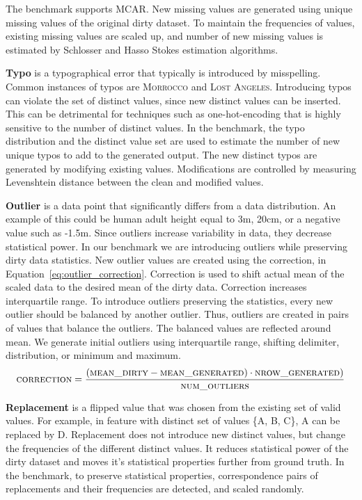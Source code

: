 The benchmark supports MCAR. 
New missing values are generated using unique missing values of the original dirty dataset. 
To maintain the frequencies of values, existing missing values are scaled up, and number of new missing values is estimated by Schlosser \cite{HassNSS1995} and Hasso Stokes \cite{HassS1998} estimation algorithms.

\textbf{Typo} is a typographical error that typically is introduced by misspelling. 
Common instances of typos are \textsc{Morrocco} and \textsc{Lost Angeles}. 
Introducing typos can violate the set of distinct values, since new distinct values can be inserted.
This can be detrimental for techniques such as one-hot-encoding that is highly sensitive to the number of distinct values.
In the benchmark, the typo distribution and the distinct value set are used to estimate the number of new unique typos to add to the generated output. 
The new distinct typos are generated by modifying existing values. Modifications are controlled by measuring Levenshtein distance between the clean and modified values. 


\textbf{Outlier} is a data point that significantly differs from a data distribution.
An example of this could be human adult height equal to 3m, 20cm, or a negative value such as -1.5m. 
Since outliers increase variability in data, they decrease statistical power.
In our benchmark we are introducing outliers while preserving dirty data statistics. 
New outlier values are created using the correction, in Equation~\ref{eq:outlier_correction}. 
Correction is used to shift actual mean of the scaled data to the desired mean of the dirty data.
Correction increases interquartile range.
To introduce outliers preserving the statistics, every new outlier should be balanced by another outlier. Thus, outliers are created in pairs of values that balance the outliers. The balanced values are reflected around mean.  
We generate initial outliers using interquartile range, shifting delimiter, distribution, or minimum and maximum.
\begin{equation}
\label{eq:outlier_correction}
\textsc{correction} = \frac{(\textsc{mean\_dirty} - \textsc{mean\_generated}) \cdot \textsc{nrow\_generated})}{\textsc{num\_outliers}}
\end{equation}

\textbf{Replacement} is a flipped value that was chosen from the existing set of valid values. 
For example, in feature with distinct set of values \textsc{\{A, B, C\}}, \textsc{A} can be replaced by \textsc{D}. 
Replacement does not introduce new distinct values, but change the frequencies of the different distinct values. 
It reduces statistical power of the dirty dataset and moves it's statistical properties further from ground truth.
In the benchmark, to preserve statistical properties, correspondence pairs of replacements and their frequencies are detected, and scaled randomly. 


